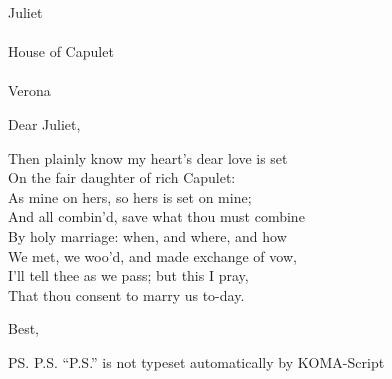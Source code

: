 \documentclass[foldmarks=false,refline=dateleft,fromrule=afteraddress,enlargefirstpage=on,fontsize=12pt,fromalign=center,subject=left,parskip=full]{scrlttr2}
\date{June  4, 2015.}
\begin{document}

\begin{letter}{%
Juliet \\\\
House of Capulet \\\\
Verona \\}

\opening{Dear Juliet,}

Then plainly know my heart's dear love is set \\
On the fair daughter of rich Capulet: \\
As mine on hers, so hers is set on mine; \\
And all combin'd, save what thou must combine \\
By holy marriage: when, and where, and how \\
We met, we woo'd, and made exchange of vow, \\
I'll tell thee as we pass; but this I pray, \\
That thou consent to marry us to-day. \\

\closing{Best,}

\ps{P.S. ``P.S.'' is not typeset automatically by KOMA-Script \\}
\end{letter}

\end{document}
